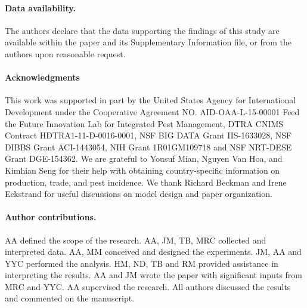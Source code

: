 \documentclass[11pt]{article}
\theoremstyle{definition}
\begin{document}
\paragraph{Data availability.} The authors declare that the data supporting the
findings of this study are available within the paper and its Supplementary
Information file, or from the authors upon reasonable request.

\paragraph{Acknowledgments}
This work was supported in part by the United States Agency for
International Development under the Cooperative Agreement NO.
AID-OAA-L-15-00001 Feed the Future Innovation Lab for Integrated Pest
Management, DTRA CNIMS Contract HDTRA1-11-D-0016-0001, NSF BIG DATA Grant
IIS-1633028, NSF DIBBS Grant ACI-1443054, NIH Grant 1R01GM109718 and NSF
NRT-DESE Grant DGE-154362.  We are grateful to Yousuf Mian, Nguyen Van Hoa,
and Kimhian Seng for their help with obtaining country-specific information
on production, trade, and pest incidence. We thank Richard Beckman and
Irene Eckstrand for useful discussions on model design and paper
organization.

\paragraph{Author contributions.}
AA defined the scope of the
research. AA, JM, TB, MRC collected and interpreted data.
AA, MM conceived and designed the
experiments. JM, AA and YYC performed the
analysis. HM, ND, TB and RM provided assistance in interpreting the
results. AA and JM wrote the paper with significant inputs from
MRC and YYC. AA supervised the research. All authors discussed the
results and commented on the manuscript.



\end{document}
